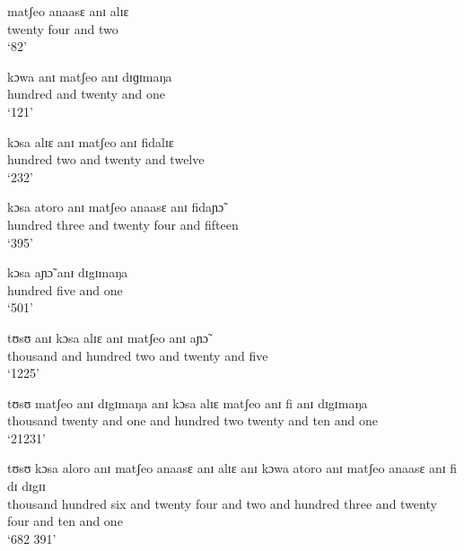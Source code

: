 \begin{exe}
\ex\label{ex:diffstrings}
\begin{xlist}


  \ex\label{ex:82}
\gll  matʃeo  anaasɛ anɪ  alɪɛ \\
      {twenty} {four} {and} {two}\\
\glt `82'

\ex\label{ex:121}
\gll  kɔwa  anɪ  matʃeo  anɪ   dɪɡɪmaŋa  \\
       {hundred}  {and}  {twenty}  {and}    {one}\\
\glt `121'

\ex\label{ex:232}
\gll  kɔsa  alɪɛ anɪ  matʃeo  anɪ fidalɪɛ\\
       {hundred}  {two}  {and}   {twenty}  {and}  {twelve}\\
\glt `232'

\ex\label{ex:395}
\gll kɔsa atoro anɪ matʃeo anaasɛ anɪ fidaɲɔ̃ \\
 {hundred} {three}  {and} {twenty}  {four} {and}  {fifteen}   \\
\glt `395'

\ex\label{ex:501}
\gll kɔsa  aɲɔ̃ anɪ  dɪgɪmaŋa\\
       {hundred} {five}  {and}  {one}  \\
\glt `501'

\ex\label{ex:1225}
\gll tʊsʊ  anɪ   kɔsa  alɪɛ   anɪ  matʃeo  anɪ  aɲɔ̃\\
       {thousand}  {and}  {hundred}  {two}  {and}  {twenty}  {and} {five}\\
\glt `1225'

\ex\label{ex:21231}
\gll tʊsʊ  matʃeo   anɪ  dɪgɪmaŋa    anɪ  kɔsa  alɪɛ  matʃeo  anɪ  fi  anɪ  
dɪgɪmaŋa    \\
       {thousand}   {twenty}   {and} {one}  {and}  {hundred}  {two}  {twenty} 
{and} {ten} {and} {one}\\
\glt `21231'

\ex\label{ex:692381}
\gll tʊsʊ kɔsa aloro anɪ matʃeo anaasɛ anɪ alɪɛ anɪ kɔwa atoro anɪ matʃeo anaasɛ
anɪ fi dɪ dɪgɪɪ \\
{thousand} {hundred} {six} {and} {twenty} {four} {and} {two} {and} {hundred}
{three} {and} {twenty} {four} {and} {ten} {and} {one}\\
\glt `682 391'

\end{xlist}
\end{exe}


